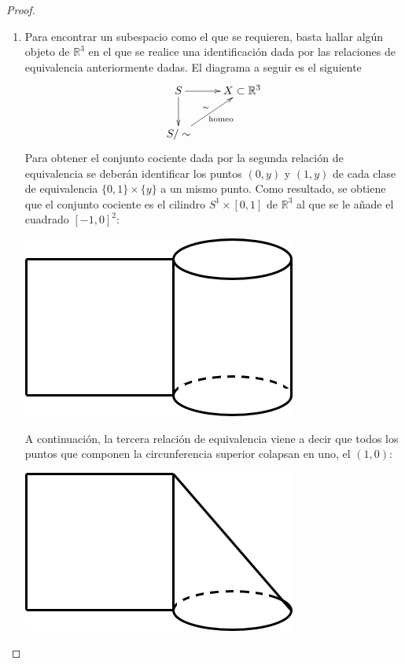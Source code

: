 \begin{itemize}
\begin{proof}
	\begin{enumerate}
		\item Para encontrar un subespacio como el que se requieren, basta hallar algún objeto de $\mathbb{R}^3$ en el que se realice una identificación dada por las relaciones de equivalencia anteriormente dadas. El diagrama a seguir es el siguiente
	\[\xymatrix{
S \ar[r] \ar[d]  & X\subset \mathbb{R}^3  \\
S/\sim \ar[ru]^{\sim}_{\mathrm{homeo}}}\]
	Para obtener el conjunto cociente dada por la segunda relación de equivalencia se deberán identificar los puntos $(0,y)$ y $(1,y)$ de cada clase de equivalencia $\{0,1\}\times \{y\}$ a un mismo punto. Como resultado, se obtiene que el conjunto cociente es el cilindro $S^1\times [0,1]$ de $\mathbb{R}^3$ al que se le añade el cuadrado $[-1,0]^2$:
 
		\begin{center}
			\includegraphics[scale=0.5]{img/ExamenSeptiembre2017/Ex2007imagen2.png} 
		\end{center}
	
	A continuación, la tercera relación de equivalencia viene a decir que todos los puntos que componen la circunferencia superior colapsan en uno, el $(1,0)$:

		\begin{center}
			\includegraphics[scale=0.5]{img/ExamenSeptiembre2017/Ex2007imagen3.png} 
		\end{center}
	

\end{enumerate}
\end{proof}
\end{itemize}
